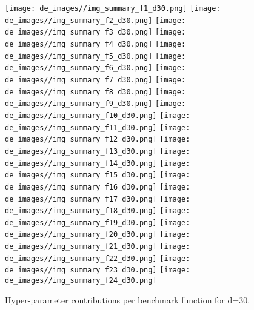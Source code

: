 \begin{figure}[t]
\centering
	\texttt{[image: de\_images//img\_summary\_f1\_d30.png]}
	\texttt{[image: de\_images//img\_summary\_f2\_d30.png]}
	\texttt{[image: de\_images//img\_summary\_f3\_d30.png]}
	\texttt{[image: de\_images//img\_summary\_f4\_d30.png]}
	\texttt{[image: de\_images//img\_summary\_f5\_d30.png]}
	\texttt{[image: de\_images//img\_summary\_f6\_d30.png]}
	\texttt{[image: de\_images//img\_summary\_f7\_d30.png]}
	\texttt{[image: de\_images//img\_summary\_f8\_d30.png]}
	\texttt{[image: de\_images//img\_summary\_f9\_d30.png]}
	\texttt{[image: de\_images//img\_summary\_f10\_d30.png]}
	\texttt{[image: de\_images//img\_summary\_f11\_d30.png]}
	\texttt{[image: de\_images//img\_summary\_f12\_d30.png]}
	\texttt{[image: de\_images//img\_summary\_f13\_d30.png]}
	\texttt{[image: de\_images//img\_summary\_f14\_d30.png]}
	\texttt{[image: de\_images//img\_summary\_f15\_d30.png]}
	\texttt{[image: de\_images//img\_summary\_f16\_d30.png]}
	\texttt{[image: de\_images//img\_summary\_f17\_d30.png]}
	\texttt{[image: de\_images//img\_summary\_f18\_d30.png]}
	\texttt{[image: de\_images//img\_summary\_f19\_d30.png]}
	\texttt{[image: de\_images//img\_summary\_f20\_d30.png]}
	\texttt{[image: de\_images//img\_summary\_f21\_d30.png]}
	\texttt{[image: de\_images//img\_summary\_f22\_d30.png]}
	\texttt{[image: de\_images//img\_summary\_f23\_d30.png]}
	\texttt{[image: de\_images//img\_summary\_f24\_d30.png]}
\caption{Hyper-parameter contributions per benchmark function for d=30. \label{fig:shapxplaind30}}

\end{figure}

